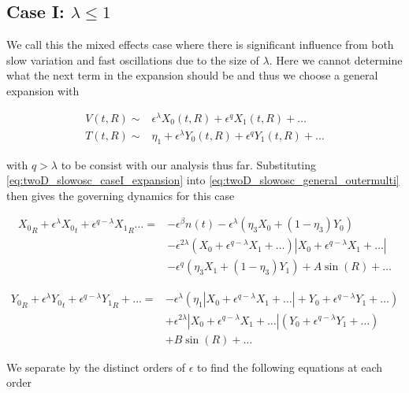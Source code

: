 \subsection{Case I: $\lambda \le 1$}

We call this the mixed effects case where there is significant influence from both slow variation and fast oscillations due to the size of $\lambda$. Here we cannot determine what the next term in the expansion should be and thus we choose a general expansion with

\begin{equation}\label{eq:twoD_slowosc_caseI_expansion}
\begin{aligned}
V(t,R)\sim& \epsilon^{\lambda} X_0(t,R)+\epsilon^q X_1(t,R)+\ldots\\
T(t,R)\sim& \eta_1+\epsilon^{\lambda} Y_0(t,R)+\epsilon^q Y_1(t,R)+\ldots
\end{aligned}
\end{equation}

with $q>\lambda$ to be consist with our analysis thus far. Substituting \eqref{eq:twoD_slowosc_caseI_expansion} into \eqref{eq:twoD_slowosc_general_outermulti} then gives the governing dynamics for this case

\begin{equation*}
\begin{aligned}
 {X_0}_R+\epsilon^{\lambda}{X_0}_t+\epsilon^{q-\lambda} {X_1}_R\ldots={} & -\epsilon^{\beta}n(t)-\epsilon^{\lambda} (\eta_3X_0+(1-\eta_3)Y_0) \\
&-\epsilon^{2\lambda}(X_0+\epsilon^{q-\lambda} X_1+\ldots)|X_0+\epsilon^{q-\lambda} X_1+\ldots|\\
& - \epsilon^{q}(\eta_3X_1+(1-\eta_3)Y_1) + A\sin(R) +\ldots
\end{aligned}
\end{equation*}

\begin{equation*}
\begin{aligned}
{Y_0}_R+\epsilon^{\lambda}{Y_0}_t+\epsilon^{q-\lambda} {Y_1}_R+\ldots= &-\epsilon^\lambda(\eta_1| X_0 +\epsilon^{q-\lambda} X_1+\ldots|+ Y_0+\epsilon^{q-\lambda} Y_1+\ldots)\\
&+\epsilon^{2\lambda}|X_0 +\epsilon^{q-\lambda} X_1+\ldots|(Y_0+\epsilon^{q-\lambda} Y_1+\ldots)\\
&+ B\sin (R)+\ldots
\end{aligned}
\end{equation*}

We separate by the distinct orders of $\epsilon$ to find the following equations at each order

